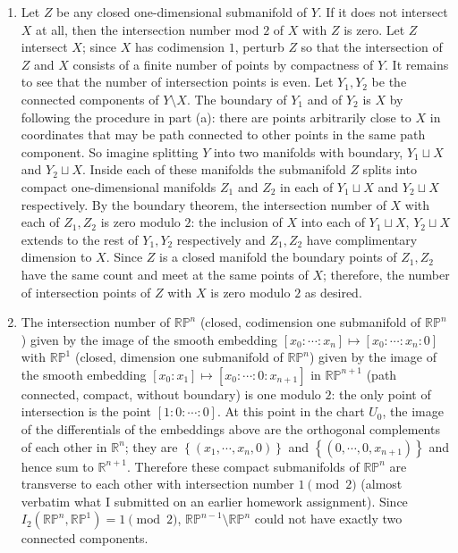 \documentclass[11pt,leqno]{article}
\theoremstyle{plain}
\theoremstyle{definition}
\numberwithin{equation}{section}
\numberwithin{lem}{section}
\newcommand{\cbr}[1]{\left\{#1\right\}}
\begin{document}
\begin{enumerate}
\begin{enumerate}
      \item Let $Z$ be any closed one-dimensional submanifold of $Y$. If it does not intersect $X$ at all, then the intersection number mod $2$ of $X$ with $Z$ is zero. Let $Z$ intersect $X$; since $X$ has codimension $1$, perturb $Z$ so that the intersection of $Z$ and $X$ consists of a finite number of points by compactness of $Y$. It remains to see that the number of intersection points is even. Let $Y_1,Y_2$ be the connected components of $Y\setminus X$. The boundary of $Y_1$ and of $Y_2$ is $X$ by following the procedure in part (a): there are points arbitrarily close to $X$ in coordinates that may be path connected to other points in the same path component. So imagine splitting $Y$ into two manifolds with boundary, $Y_1\sqcup X$ and $Y_2\sqcup X$. Inside each of these manifolds the submanifold $Z$ splits into compact one-dimensional manifolds $Z_1$ and $Z_2$ in each of $Y_1\sqcup X$ and $Y_2\sqcup X$ respectively. By the boundary theorem, the intersection number of $X$ with each of $Z_1,Z_2$ is zero modulo $2$: the inclusion of $X$ into each of $Y_1\sqcup X$, $Y_2\sqcup X$ extends to the rest of $Y_1,Y_2$ respectively and $Z_1,Z_2$ have complimentary dimension to $X$. Since $Z$ is a closed manifold the boundary points of $Z_1,Z_2$ have the same count and meet at the same points of $X$; therefore, the number of intersection points of $Z$ with $X$ is zero modulo $2$ as desired.
      \item The intersection number of $\mathbb {RP}^n$ (closed, codimension one submanifold of $\mathbb {RP}^n$) given by the image of the smooth embedding $[x_0:\cdots:x_n]\mapsto [x_0:\cdots:x_n:0]$ with $\mathbb {RP}^1$ (closed, dimension one submanifold of $\mathbb {RP}^n$) given by the image of the smooth embedding $[x_0:x_1]\mapsto [x_0:\cdots:0:x_{n+1}]$ in $\mathbb {RP}^{n+1}$ (path connected, compact, without boundary) is one modulo $2$: the only point of intersection is the point $[1:0:\cdots:0]$. At this point in the chart $U_0$, the image of the differentials of the embeddings above are the orthogonal complements of each other in $\mathbb R^n$; they are $\cbr{(x_1,\cdots,x_n,0)}$ and $\cbr{(0,\cdots,0,x_{n+1})}$ and hence sum to $\mathbb R^{n+1}$. Therefore these compact submanifolds of $\mathbb {RP}^n$ are transverse to each other with intersection number $1\pmod 2$ (almost verbatim what I submitted on an earlier homework assignment). Since $I_2(\mathbb {RP}^n,\mathbb {RP}^1) = 1\pmod 2$, $\mathbb {RP}^{n-1}\setminus \mathbb {RP}^n$ could not have exactly two connected components.
    \end{enumerate}

\end{enumerate}
\end{document}
